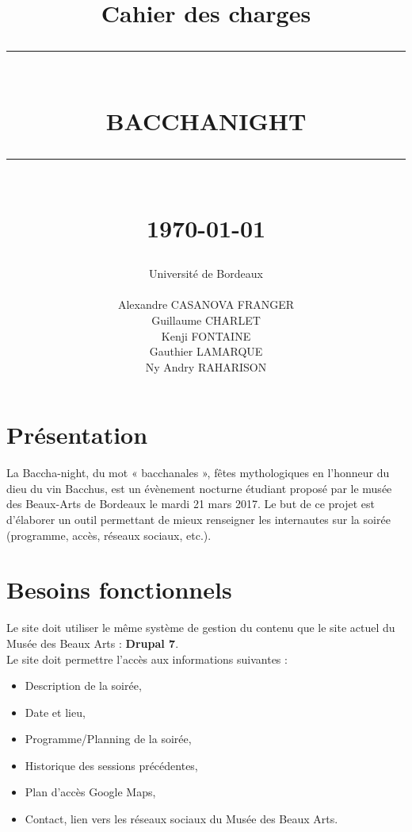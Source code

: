 \documentclass[11pt]{report}
\newcommand{\HRule}[1]{\rule{\linewidth}{#1}}
\renewcommand{\thesection}{\arabic{section}}
\begin{document}
\title
{
	\Large{Cahier des charges}
	\HRule{2pt} \\ [0.5cm]
	\LARGE \textbf{\uppercase{Bacchanight}}
	\HRule{2pt} \\ [0.5cm]
	\normalsize \today
}

\date{}

\author
{
	\LARGE{Université de Bordeaux} \\
	\\
	Alexandre CASANOVA FRANGER \\
	Guillaume CHARLET \\
    Kenji FONTAINE \\
    Gauthier LAMARQUE \\
	Ny Andry RAHARISON \\
}

\maketitle


\renewcommand{\thesection}{\arabic{section}}

\section{Présentation}

La Baccha-night, du mot « bacchanales », fêtes mythologiques en l’honneur du dieu du vin Bacchus, est un évènement nocturne étudiant proposé par le musée des Beaux-Arts de Bordeaux le mardi 21 mars 2017.
Le but de ce projet est d'élaborer un outil permettant de mieux renseigner les internautes sur la soirée (programme, accès, réseaux sociaux, etc.).

\section{Besoins fonctionnels}

Le site doit utiliser le même système de gestion du contenu que le site actuel
du Musée des Beaux Arts : \textbf{Drupal 7}. \\

Le site doit permettre l'accès aux informations suivantes :
\begin{itemize}
	\item Description de la soirée,
	\item Date et lieu,
	\item Programme/Planning de la soirée,
	\item Historique des sessions précédentes,
	\item Plan d'accès Google Maps,
	\item Contact, lien vers les réseaux sociaux du Musée des Beaux Arts.
\end{itemize}
\end{document}

